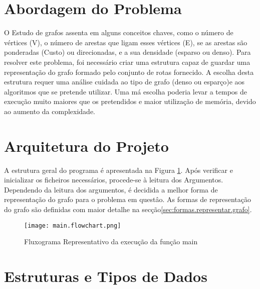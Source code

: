 \documentclass[14pt]{article}
\begin{document}
    \section{Abordagem do Problema}\label{sec:abordagem.problema}
    O Estudo de grafos assenta em alguns conceitos chaves, como o número de vértices (V), o número de arestas que ligam
    esses vértices (E), se as arestas são ponderadas (Custo) ou direcionadas, e a sua densidade (esparso ou denso).
    Para resolver este problema, foi necessário criar uma estrutura capaz de guardar uma representação do grafo formado
    pelo conjunto de rotas fornecido.
    A escolha desta estrutura requer uma análise cuidada ao tipo de grafo (denso ou esparço)e aos algoritmos que se
    pretende utilizar.
    Uma má escolha poderia levar a tempos de execução muito maiores que os pretendidos e maior utilização de memória,
    devido ao aumento da complexidade.

    \section{Arquitetura do Projeto}\label{arquitetura.projeto}
    A estrutura geral do programa é apresentada na Figura \ref{fig:main.flowchart}.
    Após verificar e inicializar os ficheiros necessários, procede-se à leitura dos Argumentos.
    Dependendo da leitura dos argumentos, é decidida a melhor forma de representação do grafo para o problema
    em questâo.
    As formas de representação do grafo são definidas com maior detalhe na secção\ref{sec:formas.representar.grafo}.

    \begin{figure}[H]
        \centering
        \label{fig:main.flowchart}
        \texttt{[image: main.flowchart.png]}
        \caption{Fluxograma Representativo da execução da função main}
    \end{figure}

    \newpage

    \section{Estruturas e Tipos de Dados}\label{sec:estruturas.tipos.dados}
\end{document}
